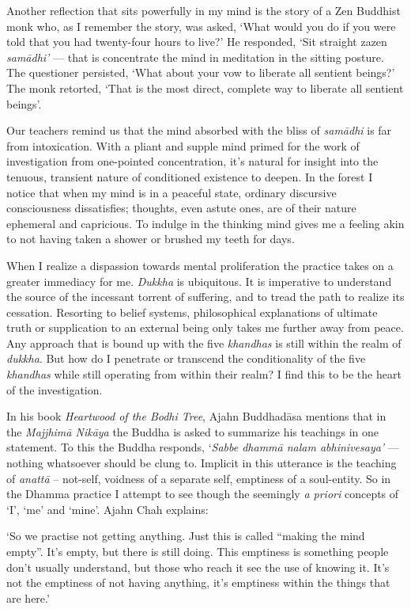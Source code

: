 Another reflection that sits powerfully in my mind is the story of a Zen
Buddhist monk who, as I remember the story, was asked, `What would you
do if you were told that you had twenty-four hours to live?' He
responded, `Sit straight zazen \emph{samādhi'} --- that is concentrate
the mind in meditation in the sitting posture. The questioner persisted,
`What about your vow to liberate all sentient beings?' The monk
retorted, `That is the most direct, complete way to liberate all
sentient beings'.

Our teachers remind us that the mind absorbed with the bliss of
\emph{samādhi} is far from intoxication. With a pliant and supple mind
primed for the work of investigation from one-pointed concentration,
it's natural for insight into the tenuous, transient nature of
conditioned existence to deepen. In the forest I notice that when my
mind is in a peaceful state, ordinary discursive consciousness
dissatisfies; thoughts, even astute ones, are of their nature ephemeral
and capricious. To indulge in the thinking mind gives me a feeling akin
to not having taken a shower or brushed my teeth for days.

When I realize a dispassion towards mental proliferation the practice
takes on a greater immediacy for me. \emph{Dukkha} is ubiquitous. It is
imperative to understand the source of the incessant torrent of
suffering, and to tread the path to realize its cessation. Resorting to
belief systems, philosophical explanations of ultimate truth or
supplication to an external being only takes me further away from peace.
Any approach that is bound up with the five \emph{khandhas} is still
within the realm of \emph{dukkha}. But how do I penetrate or transcend
the conditionality of the five \emph{khandhas} while still operating
from within their realm? I find this to be the heart of the
investigation.

In his book \emph{Heartwood of the Bodhi Tree}, Ajahn Buddhadāsa
mentions that in the \emph{Majjhimā Nikāya} the Buddha is asked to
summarize his teachings in one statement. To this the Buddha responds,
`\emph{Sabbe dhammā nalam abhinivesaya'} --- nothing whatsoever should
be clung to. Implicit in this utterance is the teaching of \emph{anattā}
-- not-self, voidness of a separate self, emptiness of a soul-entity. So
in the Dhamma practice I attempt to see though the seemingly \emph{a
priori} concepts of `I', `me' and `mine'. Ajahn Chah explains:

`So we practise not getting anything. Just this is called ``making the
mind empty''. It's empty, but there is still doing. This emptiness is
something people don't usually understand, but those who reach it see
the use of knowing it. It's not the emptiness of not having anything,
it's emptiness within the things that are here.'


